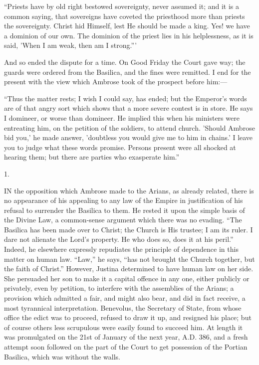 ``Priests have by old right bestowed sovereignty, never assumed
it; and it is a common saying, that sovereigns have coveted the
priesthood more than priests the sovereignty. Christ hid Himself, lest
He should be made a king. Yes! we have a dominion of our own. The
dominion of the priest lies in his helplessness, as it is said, 'When
I am weak, then am I strong.'''

And so ended the dispute for a time. On Good Friday the Court gave
way; the guards were ordered from the Basilica, and the fines were
remitted. I end for the present with the view which Ambrose took of
the prospect before him:—

``Thus the matter rests; I wish I could say, has ended; but the
Emperor's words are of that angry sort which shows that a more severe
contest is in store. He says I domineer, or worse than domineer. He
implied this when his ministers were entreating him, on the petition
of the soldiers, to attend church. 'Should Ambrose bid you,' he made
answer, 'doubtless you would give me to him in chains.' I leave you to
judge what these words promise. Persons present were all shocked at
hearing them; but there are parties who exasperate him.''


1.

IN the opposition which Ambrose made to the
Arians, as already related, there is no appearance of his appealing to
any law of the Empire in justification of his refusal to surrender the
Basilica to them. He rested it upon the simple basis of the Divine
Law, a common-sense argument which there was no evading. ``The
Basilica has been made over to Christ; the Church is His trustee; I am
its ruler. I dare not alienate the Lord's property. He who does so,
does it at his peril.'' Indeed, he elsewhere expressly repudiates
the principle of dependence in this matter on human law.
``Law,'' he says, ``has not brought the Church together,
but the faith of Christ.'' However, Justina determined to have
human law on her side. She persuaded her son to make it a capital
offence in any one, either publicly or privately, even by petition, to
interfere with the assemblies of the Arians; a provision which
admitted a fair, and might also bear, and did in fact receive, a most
tyrannical interpretation. Benevolus, the Secretary of State, from
whose office the edict was to proceed, refused to draw it up, and
resigned his place; but of course others less scrupulous were easily
found to succeed him. At length it was promulgated on the 21st of
January of the next year, A.D. 386, and a fresh
attempt soon followed on the part of the Court to get possession of
the Portian Basilica, which was without the walls.

